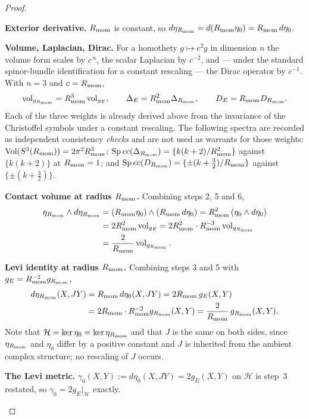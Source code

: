 \documentclass[11pt]{article}
\begin{document}
\begin{proof}
\begin{proofsteps}
\item \textbf{Exterior derivative.}
\(R_{\mathrm{mom}}\) is constant, so \(d\eta_{R_{\mathrm{mom}}}=d(R_{\mathrm{mom}}\eta_0)=R_{\mathrm{mom}}\,d\eta_0\).

\item \textbf{Volume, Laplacian, Dirac.}
For a homothety \(g\mapsto c^2g\) in dimension \(n\) the volume form scales by
\(c^{\,n}\), the scalar Laplacian by \(c^{-2}\), and — under the standard
spinor-bundle identification for a constant rescaling — the Dirac operator by
\(c^{-1}\).  With \(n=3\) and \(c=R_{\mathrm{mom}}\),
\[
  \operatorname{vol}_{g_{R_{\mathrm{mom}}}}=R_{\mathrm{mom}}^3\operatorname{vol}_{g_E},
  \qquad
  \Delta_E=R_{\mathrm{mom}}^2\Delta_{R_{\mathrm{mom}}},
  \qquad
  D_E=R_{\mathrm{mom}} D_{R_{\mathrm{mom}}}.
\]
Each of the three weights is already derived above from the invariance of the
Christoffel symbols under a constant rescaling.  The following spectra are
recorded as independent consistency \emph{checks} and are not used as warrants
for those weights: \(\operatorname{Vol}(S^3(R_{\mathrm{mom}}))=2\pi^2R_{\mathrm{mom}}^3\);
\(\operatorname{Sp}ec(\Delta_{R_{\mathrm{mom}}})=\{k(k+2)/R_{\mathrm{mom}}^2\}\) against \(\{k(k+2)\}\) at
\(R_{\mathrm{mom}}=1\); and \(\operatorname{Sp}ec(D_{R_{\mathrm{mom}}})=\{\pm(k+\tfrac32)/R_{\mathrm{mom}}\}\) against
\(\{\pm(k+\tfrac32)\}\).

\item \textbf{Contact volume at radius \(R_{\mathrm{mom}}\).}
Combining steps 2, 5 and 6,
\[
\begin{aligned}
  \eta_{R_{\mathrm{mom}}}\wedge d\eta_{R_{\mathrm{mom}}}
  &=(R_{\mathrm{mom}}\eta_0)\wedge(R_{\mathrm{mom}}\,d\eta_0)
   =R_{\mathrm{mom}}^2\,(\eta_0\wedge d\eta_0)\\
  &=2R_{\mathrm{mom}}^2\operatorname{vol}_{g_E}
   =2R_{\mathrm{mom}}^2\cdot R_{\mathrm{mom}}^{-3}\operatorname{vol}_{g_{R_{\mathrm{mom}}}}\\
  &=\frac{2}{R_{\mathrm{mom}}}\operatorname{vol}_{g_{R_{\mathrm{mom}}}} .
\end{aligned}
\]

\item \textbf{Levi identity at radius \(R_{\mathrm{mom}}\).}
Combining steps 3 and 5 with \(g_E=R_{\mathrm{mom}}^{-2}g_{R_{\mathrm{mom}}}\),
\[
\begin{aligned}
  d\eta_{R_{\mathrm{mom}}}(X,JY)
  &=R_{\mathrm{mom}}\,d\eta_0(X,JY)
   =2R_{\mathrm{mom}}\,g_E(X,Y)\\
  &=2R_{\mathrm{mom}}\cdot R_{\mathrm{mom}}^{-2}g_{R_{\mathrm{mom}}}(X,Y)
   =\frac{2}{R_{\mathrm{mom}}}\,g_{R_{\mathrm{mom}}}(X,Y).
\end{aligned}
\]
Note that \(\mathcal H=\ker\eta_0=\ker\eta_{R_{\mathrm{mom}}}\) and that \(J\) is the same
on both sides, since \(\eta_{R_{\mathrm{mom}}}\) and \(\eta_0\) differ by a positive
constant and \(J\) is inherited from the ambient complex structure; no
rescaling of \(J\) occurs.

\item \textbf{The Levi metric.}
\(\gamma_0(X,Y):=d\eta_0(X,JY)=2g_E(X,Y)\) on \(\mathcal H\) is step~3 restated,
so \(\gamma_0=2g_E|_{\mathcal H}\) exactly.


\end{proofsteps}
\end{proof}
\end{document}
